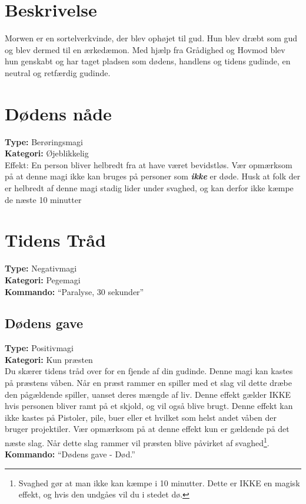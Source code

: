 \section{Beskrivelse}
Morwen er en sortelverkvinde, der blev ophøjet til gud. Hun blev dræbt som gud og blev dermed til en ærkedæmon. Med hjælp fra Grådighed og Hovmod blev hun genskabt og har taget pladsen som dødens, handlens og tidens gudinde, en neutral og retfærdig gudinde.\\

\section{Dødens nåde}
\textbf{Type:} Berøringsmagi\\
\textbf{Kategori:} Øjeblikkelig\\
Effekt: En person bliver helbredt fra at have været bevidstløs. Vær opmærksom på at denne magi ikke kan bruges på personer som \textbf{\textit{ikke}} er døde. Husk at folk der er helbredt af denne magi stadig lider under svaghed, og kan derfor ikke kæmpe de næste 10 minutter

\section{Tidens Tråd}
\textbf{Type:} Negativmagi\\
\textbf{Kategori:} Pegemagi\\
\textbf{Kommando:} “Paralyse, 30 sekunder”

\subsection{Dødens gave}
\textbf{Type:} Positivmagi\\
\textbf{Kategori:} Kun præsten\\
Du skærer tidens tråd over for en fjende af din gudinde. Denne magi kan kastes på præstens våben. Når en præst rammer en spiller med et slag vil dette dræbe den pågældende spiller, uanset deres mængde af liv.
Denne effekt gælder IKKE hvis personen bliver ramt på et skjold, og vil også blive brugt. Denne effekt kan ikke kastes på Pistoler, pile, buer eller et hvilket som helst andet våben der bruger projektiler. Vær opmærksom på at denne effekt kun er gældende på det næste slag. Når dette slag rammer vil præsten blive påvirket af svaghed\footnote{Svaghed gør at man ikke kan kæmpe i 10 minutter. Dette er IKKE en magisk effekt, og hvis den undgåes vil du i stedet dø.}.\\
\textbf{Kommando:} “Dødens gave - Død.”

